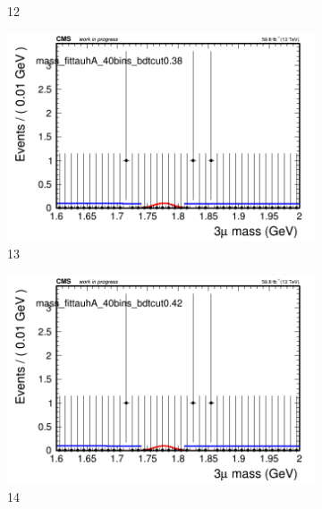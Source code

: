\begin{figure}[h!]
\begin{subfigure}{0.2\textwidth}
        \caption{12}
    \end{subfigure}
    \begin{subfigure}{0.2\textwidth}
        \includegraphics[width=\textwidth]{power_law/plots/tauhA/massfit_tauhA_40bins_bdtcut0.38.png}
        \caption{13}
    \end{subfigure}
    \begin{subfigure}{0.2\textwidth}
        \includegraphics[width=\textwidth]{power_law/plots/tauhA/massfit_tauhA_40bins_bdtcut0.42.png}
        \caption{14}
    \end{subfigure}
    \begin{subfigure}{0.2\textwidth}

\end{subfigure}
\end{figure}
